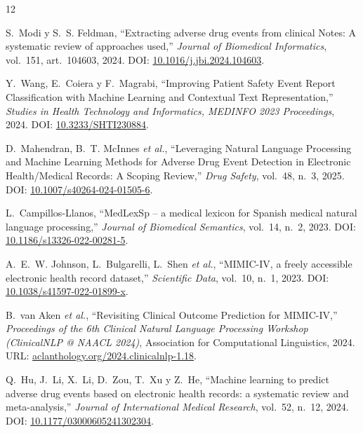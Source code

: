 \documentclass[11pt,a4paper]{article}
\begin{document}
\begin{thebibliography}{12}

S.~Modi y S.~S. Feldman,
\enquote{Extracting adverse drug events from clinical Notes: A systematic review of approaches used,}
\textit{Journal of Biomedical Informatics}, vol.~151, art.~104603, 2024.
DOI: \href{https://doi.org/10.1016/j.jbi.2024.104603}{10.1016/j.jbi.2024.104603}.

Y.~Wang, E.~Coiera y F.~Magrabi,
\enquote{Improving Patient Safety Event Report Classification with Machine Learning and Contextual Text Representation,}
\textit{Studies in Health Technology and Informatics, MEDINFO 2023 Proceedings}, 2024.
DOI: \href{https://doi.org/10.3233/SHTI230884}{10.3233/SHTI230884}.

D.~Mahendran, B.~T. McInnes \textit{et al.},
\enquote{Leveraging Natural Language Processing and Machine Learning Methods for Adverse Drug Event Detection in Electronic Health/Medical Records: A Scoping Review,}
\textit{Drug Safety}, vol.~48, n.\textordmasculine~3, 2025.
DOI: \href{https://doi.org/10.1007/s40264-024-01505-6}{10.1007/s40264-024-01505-6}.

L.~Campillos-Llanos,
\enquote{MedLexSp -- a medical lexicon for Spanish medical natural language processing,}
\textit{Journal of Biomedical Semantics}, vol.~14, n.\textordmasculine~2, 2023.
DOI: \href{https://doi.org/10.1186/s13326-022-00281-5}{10.1186/s13326-022-00281-5}.

A.~E.~W. Johnson, L.~Bulgarelli, L.~Shen \textit{et al.},
\enquote{MIMIC-IV, a freely accessible electronic health record dataset,}
\textit{Scientific Data}, vol.~10, n.\textordmasculine~1, 2023.
DOI: \href{https://doi.org/10.1038/s41597-022-01899-x}{10.1038/s41597-022-01899-x}.

B.~van Aken \textit{et al.},
\enquote{Revisiting Clinical Outcome Prediction for MIMIC-IV,}
\textit{Proceedings of the 6th Clinical Natural Language Processing Workshop (ClinicalNLP @ NAACL 2024)}, Association for Computational Linguistics, 2024.
URL: \href{https://aclanthology.org/2024.clinicalnlp-1.18}{aclanthology.org/2024.clinicalnlp-1.18}.

Q.~Hu, J.~Li, X.~Li, D.~Zou, T.~Xu y Z.~He,
\enquote{Machine learning to predict adverse drug events based on electronic health records: a systematic review and meta-analysis,}
\textit{Journal of International Medical Research}, vol.~52, n.\textordmasculine~12, 2024.
DOI: \href{https://doi.org/10.1177/03000605241302304}{10.1177/03000605241302304}.


\end{thebibliography}
\end{document}
